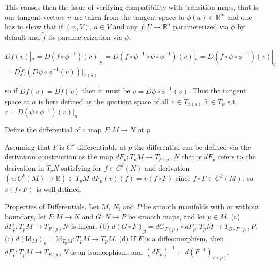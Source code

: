 This causes then the issue of verifying compatibility with transition maps, that is our tangent vectors \( v \) are taken from the tangent space 
to \( \phi(a) \in \mathbb{R}^m \) and one has to show that if \( (\psi, V) \), \( a \in V \) and any \( f : U \to \mathbb{R}^n \)
parameterized via \( \phi \) by default and \( \tilde{f} \) its parameterization via \( \psi \):

\( Df(v)|_a = D(f \circ \phi^{-1})(v)|_a = D(f \circ \psi^{-1} \circ \psi \circ \phi^{-1})(v)|_a = D(\tilde{f} \circ \psi \circ \phi^{-1})(v)|_a \)
\( = D\tilde{f})(D \psi \circ \phi^{-1}(v))|_{\psi(a)}\)

so if \( Df(v) = D\tilde{f}(\tilde{v})\) then it must be \( \tilde{v} = D \psi \circ \phi^{-1}(v) \).
Thus the tangent space at \( a \) is here defined as the quotient space of all \( v \in T_{\phi(a)}, \tilde{v} \in T_{\psi} \)
s.t.   
\( \tilde{v} = D(\psi \circ \phi^{-1})(v)|_{a} \)


Define the differential of a map \( F : M \to N \) at \( p \)

Assuming that \( F \) is \( C^k \) differentiable at \( p \) the differential can be defined via the derivation construction
as the map \( dF_p : T_p M \to T_{F(p)} N\) that is  \( dF_p \) refers to the derivation in \( T_p N \) satisfying
for \( f \in C^k(N)\) and derivation \( (v : C^k(M) \to \mathbb{R}) \in T_p M \)
\( dF_p(v)(f) = v(f \circ F) \)
since \( f \circ F \in C^k(M) \), so \( v(f \circ F) \) is well defined.

Properties of Differentials. 
Let \(M\), \(N\), and \(P\) be smooth manifolds with or without boundary, let \(F: M \to N\) and \(G: N \to P\) be smooth maps, and let \(p \in M\).
(a) \(dF_p: T_pM \to T_{F(p)}N\) is linear.
(b) \(d(G \circ F)_p = dG_{F(p)} \circ dF_p: T_pM \to T_{G \circ F(p)}P\).
(c) \(d(\text{Id}_M)_p = \text{Id}_{T_pM}: T_pM \to T_pM\).
(d) If \(F\) is a diffeomorphism, then \(dF_p: T_pM \to T_{F(p)}N\) is an isomorphism, and \((dF_p)^{-1} = d(F^{-1})_{F(p)}\).

